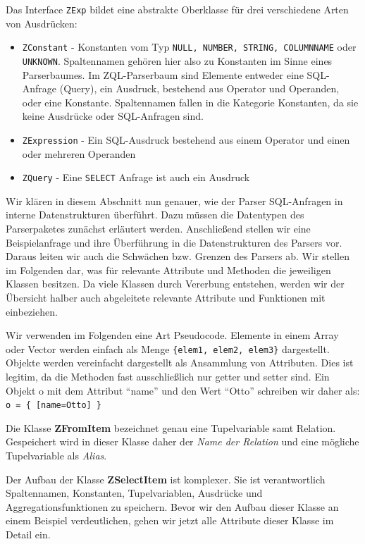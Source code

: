 Das Interface \verb|ZExp| bildet eine abstrakte Oberklasse für drei verschiedene Arten von Ausdrücken:

\begin{itemize}
\item \verb|ZConstant| - Konstanten vom Typ \verb|NULL, NUMBER, STRING, COLUMNNAME| oder \verb|UNKNOWN|. Spaltennamen gehören hier also zu Konstanten im Sinne eines Parserbaumes. Im ZQL-Parserbaum sind Elemente entweder eine SQL-Anfrage (Query), ein Ausdruck, bestehend aus Operator und Operanden, oder eine Konstante. Spaltennamen fallen in die Kategorie Konstanten, da sie keine Ausdrücke oder SQL-Anfragen sind. 
\item \verb|ZExpression| - Ein SQL-Ausdruck bestehend aus einem Operator und einen oder mehreren Operanden
\item \verb|ZQuery| - Eine \verb|SELECT| Anfrage ist auch ein Ausdruck
\end{itemize}

Wir klären in diesem Abschnitt nun genauer, wie der Parser SQL-Anfragen in interne Datenstrukturen überführt.
Dazu müssen die Datentypen des Parserpaketes zunächst erläutert werden. Anschließend stellen wir eine Beispielanfrage und ihre Überführung in die Datenstrukturen des Parsers vor. Daraus leiten wir auch die Schwächen bzw. Grenzen des Parsers ab. Wir stellen im Folgenden dar, was für relevante Attribute und Methoden die jeweiligen Klassen besitzen. Da viele Klassen durch Vererbung entstehen, werden wir der Übersicht halber auch abgeleitete relevante Attribute und Funktionen mit einbeziehen. 

Wir verwenden im Folgenden eine Art Pseudocode. Elemente in einem Array oder Vector werden einfach als Menge \verb|{elem1, elem2, elem3}| dargestellt. Objekte werden vereinfacht dargestellt als Ansammlung von Attributen. Dies ist legitim, da die Methoden fast ausschließlich nur getter und setter sind. Ein Objekt o mit dem Attribut ``name'' und den Wert ``Otto'' schreiben wir daher als: 
\verb|o = { [name=Otto] }|

Die Klasse \textbf{ZFromItem} bezeichnet genau eine Tupelvariable samt Relation. Gespeichert wird in dieser Klasse daher der \textit{Name der Relation} und eine mögliche Tupelvariable als \textit{Alias}.

Der Aufbau der Klasse \textbf{ZSelectItem} ist komplexer. Sie ist verantwortlich Spaltennamen, Konstanten, Tupelvariablen, Ausdrücke und Aggregationsfunktionen zu speichern. Bevor wir den Aufbau dieser Klasse an einem Beispiel verdeutlichen, gehen wir jetzt alle Attribute dieser Klasse im Detail ein.

